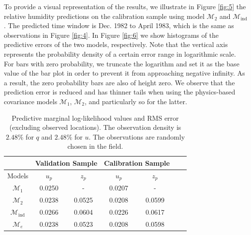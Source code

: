 \documentclass[article,ij4uq]{ij4uq}              %
\newcommand{\cm}[1]{{\color{red}Mihai:{#1}}}
\newcommand{\YC}[1]{\textcolor{blue}{[Yian:#1]}}
\begin{document}
\par To provide a visual representation of the results, we illustrate in Figure \ref{fig:5} the relative humidity predictions on the calibration sample using model $\mathcal{M}_{2}$ and $\mathcal{M}_{\mathrm{ind}}$. The predicted time window is Dec. 1982 to April 1983, which is the same as observations in Figure \ref{fig:4}. In Figure \ref{fig:6} we show histograms of the predictive errors of the two models, respectively. Note that the vertical axis represents the probability density of a certain error range in logarithmic scale. For bars with zero probability, we truncate the logarithm and set it as the base value of the bar plot in order to prevent it from approaching negative infinity. As a result, the zero probability bars are also of height zero. We  observe that the prediction error is reduced and has thinner tails when using the physics-based covariance models $\mathcal{M}_{1}$, $\mathcal{M}_{2}$, and particularly so for the latter. 


\begin{table}[!t]
\centering
 \caption{Predictive marginal log-likelihood values and RMS error (excluding observed locations). The observation density is $2.48\%$ for $q$ and $2.48\%$ for $u$. The observations are randomly chosen in the field.}\label{table:2}
\begin{tabular}{|c|c|c|c|c|c|c|}
\hline
 & \multicolumn{2}{c}{Validation Sample} & \multicolumn{2}{|c|}{Calibration Sample}\\
 \hline
 Models & $u_{p}$ & $z_{p}$ & $u_{p}$ & $z_{p}$\\
\hline
\hline
$\mathcal{M}_{1}$  & 0.0250 & -  & 0.0207 & - \\
\hline
$\mathcal{M}_{2}$  & 0.0238 & 0.0525  & 0.0208 & 0.0599 \\
\hline
$\mathcal{M}_{\mathrm{ind}}$  & 0.0266 & 0.0604  & 0.0226 & 0.0617 \\
\hline
\hline
$\mathcal{M}_{e}$  & 0.0238 & 0.0523  & 0.0208 & 0.0598 \\
\hline
\end{tabular}
\end{table}
\end{document}
